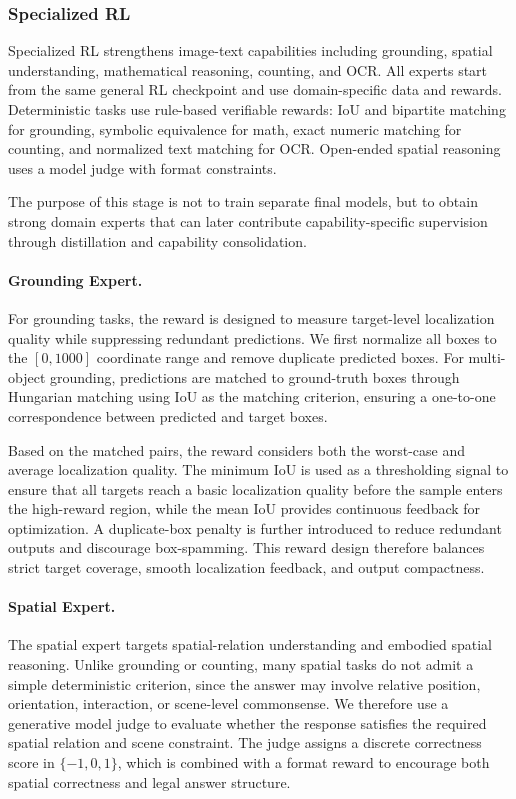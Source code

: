 \documentclass{article} %
\begin{document}
\subsubsection{Specialized RL}

Specialized RL strengthens image-text capabilities including grounding, spatial understanding, mathematical reasoning, counting, and OCR. All experts start from the same general RL checkpoint and use domain-specific data and rewards. Deterministic tasks use rule-based verifiable rewards: IoU and bipartite matching for grounding, symbolic equivalence for math, exact numeric matching for counting, and normalized text matching for OCR. Open-ended spatial reasoning uses a model judge with format constraints.

The purpose of this stage is not to train separate final models, but to obtain strong domain experts that can later contribute capability-specific supervision through distillation and capability consolidation.

\paragraph{Grounding Expert.}
For grounding tasks, the reward is designed to measure target-level localization quality while suppressing redundant predictions. We first normalize all boxes to the $[0,1000]$ coordinate range and remove duplicate predicted boxes. For multi-object grounding, predictions are matched to ground-truth boxes through Hungarian matching using IoU as the matching criterion, ensuring a one-to-one correspondence between predicted and target boxes.

Based on the matched pairs, the reward considers both the worst-case and average localization quality. The minimum IoU is used as a thresholding signal to ensure that all targets reach a basic localization quality before the sample enters the high-reward region, while the mean IoU provides continuous feedback for optimization. A duplicate-box penalty is further introduced to reduce redundant outputs and discourage box-spamming. This reward design therefore balances strict target coverage, smooth localization feedback, and output compactness.

\paragraph{Spatial Expert.}
The spatial expert targets spatial-relation understanding and embodied spatial reasoning. Unlike grounding or counting, many spatial tasks do not admit a simple deterministic criterion, since the answer may involve relative position, orientation, interaction, or scene-level commonsense. We therefore use a generative model judge to evaluate whether the response satisfies the required spatial relation and scene constraint. The judge assigns a discrete correctness score in $\{-1,0,1\}$, which is combined with a format reward to encourage both spatial correctness and legal answer structure.
\end{document}
